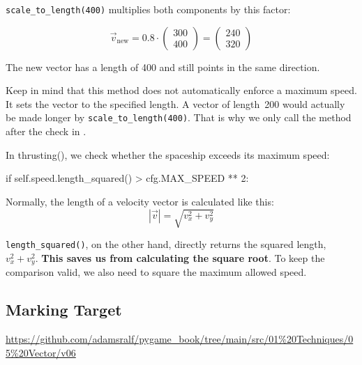 \texttt{scale\_to\_length(400)} multiplies both components by this factor:

\[
\vec{v}_{\mathrm{new}}
= 0.8 \cdot
\begin{pmatrix} 300 \\ 400 \end{pmatrix}
= \begin{pmatrix} 240 \\ 320 \end{pmatrix}
\]

The new vector has a length of 400 and still points in the same direction.

Keep in mind that this method does not automatically enforce a maximum speed. It sets the vector to the specified length. A vector of length~200 would actually be made longer by \texttt{scale\_to\_length(400)}. That is why we only call the method after the check in .


\begin{hintbox}
	In thrusting(), we check whether the spaceship exceeds its maximum speed:
	
	\begin{codebox}
		if self.speed.length_squared() > cfg.MAX_SPEED ** 2:
	\end{codebox}
	
	Normally, the length of a velocity vector is calculated like this:
	\[
	|\vec{v}| = \sqrt{v_x^2 + v_y^2}
	\]
	
	\texttt{length\_squared()}, on the other hand, directly returns the squared length, $v^2_x + v_y^2$. \textbf{This saves us from calculating the square root}. To keep the comparison valid, we also need to square the maximum allowed speed.
\end{hintbox}

\newpage
\subsection{Marking Target}\label{secVectorSpaceshipMarkingTarget}

\begin{diskbox}
	\url{https://github.com/adamsralf/pygame_book/tree/main/src/01%20Techniques/05%20Vector/v06}
\end{diskbox}

